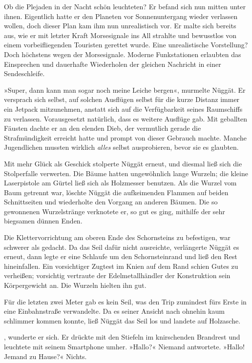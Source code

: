 Ob die Plejaden in der Nacht schön leuchteten? Er befand sich nun mitten unter ihnen. Eigentlich hatte er den Planeten vor Sonnenuntergang wieder verlassen wollen, doch dieser Plan kam ihm nun unrealistisch vor. Er malte sich bereits aus, wie er mit letzter Kraft Morsesignale ins All strahlte und bewusstlos von einem vorbeifliegenden Touristen gerettet wurde. Eine unrealistische Vorstellung? Doch höchstens wegen der Morsesignale. Moderne Funkstationen erlaubten das Einsprechen und dauerhafte Wiederholen der gleichen Nachricht in einer Sendeschleife.

»Super, dann kann man sogar noch meine Leiche bergen«, murmelte Nüggät. Er versprach sich selbst, auf solchen Ausflügen selbst für die kurze Distanz immer ein Jetpack mitzunehmen, anstatt sich auf die Verfügbarkeit seines Raumschiffs zu verlassen. Vorausgesetzt natürlich, dass es weitere Ausflüge gab. Mit geballten Fäusten dachte er an den elenden Dieb, der vermutlich gerade die Strafmündigkeit erreicht hatte und prompt von dieser Gebrauch machte. Manche Jugendlichen mussten wirklich \emph{alles} selbst ausprobieren, bevor sie es glaubten.

Mit mehr Glück als Geschick stolperte Nüggät erneut, und diesmal ließ sich die Stolperfalle verwerten. Die Bäume hatten ungewöhnlich lange Wurzeln; die kleine Laserpistole am Gürtel ließ sich als Holzmesser benutzen. Als die Wurzel vom Baum getrennt war, löschte Nüggät die aufkeimenden Flammen auf beiden Schnittseiten und wiederholte den Vorgang an anderen Bäumen. Die so gewonnenen Wurzelstränge verknotete er, so gut es ging, mithilfe der sehr biegsamen dünnen Enden.

Die Klettervorrichtung am oberen Ende des Schornsteins zu befestigen, war schwerer als gedacht. Da das Seil dafür nicht ausreichte, verlängerte Nüggät es erneut, dann legte er eine Schlaufe um den Schornsteinrand und ließ den Rest hineinfallen. Ein vorsichtiger Zugtest im Knien auf dem Rand schien Gutes zu verheißen; vorsichtig vertraute der Edelmetallhändler der Konstruktion sein Körpergewicht an. Die Wurzeln hielten ihn gut.

Für die letzten zwei Meter gab es kein Seil, was den Trip zumindest fürs Erste in eine Einbahnstraße verwandelte. Da es seiner Ansicht nach ohnehin kaum schlimmer kommen konnte, ließ Nüggät das Seil los und landete auf Holzasche.

, wunderte er sich. Er drückte mit den Stiefeln im knirschenden Brandrest und leuchtete mit seinem Smartphone umher. »Hallo?« Niemand antwortete. »Hallo! Jemand zu Hause?« Nichts.

